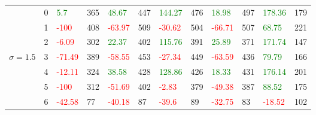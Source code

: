 \begin{table}[!htb]
\begin{adjustwidth}{-0.8in}{-0.9in}
\begin{tabular}{|p{4em}|p{2em}|p{3em}|p{3em}|p{3em}|p{3em}|p{3em}|p{3em}|p{3em}|p{3em}|p{3em}|p{3em}|}
            & 0 & \textcolor{green}{5.7} & 365 & \textcolor{green}{48.67} & 447 & \textcolor{green}{144.27} & 476 & \textcolor{green}{18.98} & 497 & \textcolor{green}{178.36} & 179\\\cline{3-12}
            & 1 & \textcolor{red}{-100} & 408 & \textcolor{red}{-63.97} & 509 & \textcolor{red}{-30.62} & 504 & \textcolor{red}{-66.71} & 507 & \textcolor{green}{68.75} & 221\\\cline{3-12}
            & 2 & \textcolor{red}{-6.09} & 302 & \textcolor{green}{22.37} & 402 & \textcolor{green}{115.76} & 391 & \textcolor{green}{25.89} & 371 & \textcolor{green}{171.74} & 147\\\cline{3-12}
            $\sigma=1.5$ & 3 & \textcolor{red}{-71.49} & 389 & \textcolor{red}{-58.55} & 453 & \textcolor{red}{-27.34} & 449 & \textcolor{red}{-63.59} & 436 & \textcolor{green}{79.79} & 166\\\cline{3-12}
            & 4 & \textcolor{red}{-12.11} & 324 & \textcolor{green}{38.58} & 428 & \textcolor{green}{128.86} & 426 & \textcolor{green}{18.33} & 431 & \textcolor{green}{176.14} & 201\\\cline{3-12}
            & 5 & \textcolor{red}{-100} & 312 & \textcolor{red}{-51.69} & 402 & \textcolor{red}{-2.83} & 379 & \textcolor{red}{-49.38} & 387 & \textcolor{green}{88.52} & 175\\\cline{3-12}
            & 6 & \textcolor{red}{-42.58} & 77 & \textcolor{red}{-40.18} & 87 & \textcolor{red}{-39.6} & 89 & \textcolor{red}{-32.75} & 83 & \textcolor{red}{-18.52} & 102\\\hline\hline
            

\end{tabular}
\end{adjustwidth}
\end{table}
